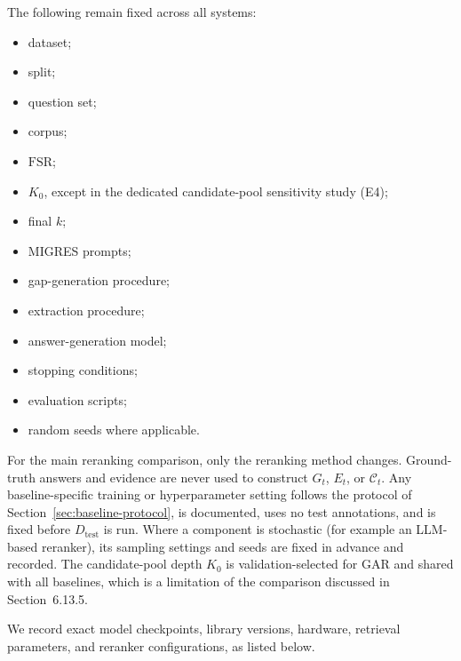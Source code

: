 \documentclass[11pt,a4paper]{article}
\begin{document}
The following remain fixed across all systems:
\begin{itemize}[leftmargin=1.5em]
\item dataset;
\item split;
\item question set;
\item corpus;
\item $\mathrm{FSR}$;
\item $K_0$, except in the dedicated candidate-pool sensitivity study (E4);
\item final $k$;
\item MIGRES prompts;
\item gap-generation procedure;
\item extraction procedure;
\item answer-generation model;
\item stopping conditions;
\item evaluation scripts;
\item random seeds where applicable.
\end{itemize}
For the main reranking comparison, only the reranking method changes. Ground-truth answers and evidence are never used to construct $G_t$, $E_t$, or $\mathcal{C}_t$. Any baseline-specific training or hyperparameter setting follows the protocol of Section~\ref{sec:baseline-protocol}, is documented, uses no test annotations, and is fixed before $D_{\mathrm{test}}$ is run. Where a component is stochastic (for example an LLM-based reranker), its sampling settings and seeds are fixed in advance and recorded. The candidate-pool depth $K_0$ is validation-selected for GAR and shared with all baselines, which is a limitation of the comparison discussed in Section~6.13.5.

We record exact model checkpoints, library versions, hardware, retrieval parameters, and reranker configurations, as listed below.
\end{document}
